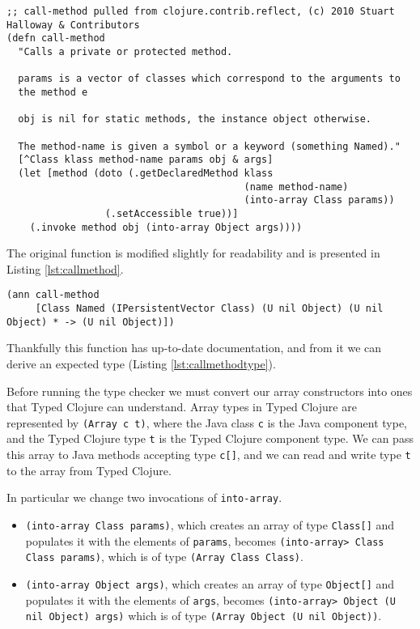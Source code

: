 \begin{lstlisting}[caption=call-method, label=lst:callmethod]
;; call-method pulled from clojure.contrib.reflect, (c) 2010 Stuart Halloway & Contributors
(defn call-method
  "Calls a private or protected method.

  params is a vector of classes which correspond to the arguments to
  the method e

  obj is nil for static methods, the instance object otherwise.

  The method-name is given a symbol or a keyword (something Named)."
  [^Class klass method-name params obj & args]
  (let [method (doto (.getDeclaredMethod klass 
                                         (name method-name)
                                         (into-array Class params))
                 (.setAccessible true))]
    (.invoke method obj (into-array Object args))))
\end{lstlisting}

The original function is modified slightly for readability and is presented in Listing \ref{lst:callmethod}.

\begin{lstlisting}[caption=call-method Type Annotation, label=lst:callmethodtype]
(ann call-method 
     [Class Named (IPersistentVector Class) (U nil Object) (U nil Object) * -> (U nil Object)])
\end{lstlisting}

Thankfully this function has up-to-date documentation, and from it we can derive an expected type
(Listing \ref{lst:callmethodtype}).

Before running the type checker we must convert our array constructors into ones that Typed Clojure
can understand. Array types in Typed Clojure are represented by \lstinline|(Array c t)|, where
the Java class \lstinline|c| is the Java component type,
and the Typed Clojure type \lstinline|t| is the Typed Clojure component type. 
We can pass this array to Java methods accepting
type \lstinline|c[]|, and we can read and write type \lstinline|t| to the array from Typed Clojure.

In particular we change two invocations of \lstinline|into-array|.

\begin{itemize}
\item \lstinline|(into-array Class params)|, which creates an array of type \lstinline|Class[]| and populates it
with the elements of \lstinline|params|,
 becomes \lstinline|(into-array> Class Class params)|,
      which is of type \lstinline|(Array Class Class)|.
\item \lstinline|(into-array Object args)|, which creates an array of type \lstinline|Object[]|
and populates it with the elements of \lstinline|args|,
becomes \lstinline|(into-array> Object (U nil Object) args)|
      which is of type \lstinline|(Array Object (U nil Object))|.
\end{itemize}

